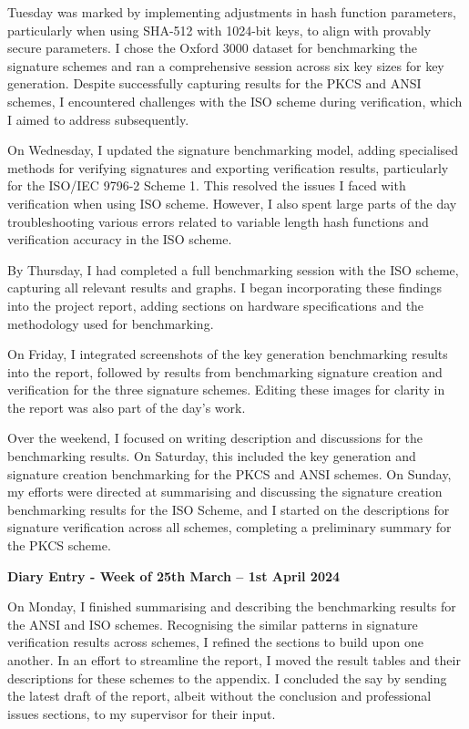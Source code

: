\documentclass[]{final_report}
\theoremstyle{definition}
\begin{document}
Tuesday was marked by implementing adjustments in hash function parameters, particularly when using SHA-512 with
1024-bit keys, to align with provably secure parameters. I chose the Oxford 3000 dataset for benchmarking the signature
schemes and ran a comprehensive session across six key sizes for key generation. Despite successfully capturing results
for the PKCS and ANSI schemes, I encountered challenges with the ISO scheme during verification, which I aimed to
address subsequently.

On Wednesday, I updated the signature benchmarking model, adding specialised methods for verifying signatures and
exporting verification results, particularly for the ISO/IEC 9796-2 Scheme 1. This resolved the issues I faced with verification when using ISO scheme. However, I also spent large parts of the day troubleshooting various errors related to variable length hash
functions and verification accuracy in the ISO scheme.

By Thursday, I had completed a full benchmarking session with the ISO scheme, capturing all relevant results and graphs.
I began incorporating these findings into the project report, adding sections on hardware specifications and the
methodology used for benchmarking.

On Friday, I integrated screenshots of the key generation benchmarking results into the report, followed by results from
benchmarking signature creation and verification for the three signature schemes. Editing these images for clarity in
the report was also part of the day’s work.

Over the weekend, I focused on writing description and discussions for the benchmarking results. On Saturday,
this included the key generation and signature creation benchmarking for the PKCS and ANSI schemes. On Sunday, my
efforts were directed at summarising and discussing the signature creation benchmarking results for the ISO Scheme, and
I started on the descriptions for signature verification across all schemes, completing a preliminary summary for the
PKCS scheme.

\textbf{Diary Entry - Week of 25th March – 1st April 2024}

On Monday, I finished summarising and describing the benchmarking results for the ANSI and ISO schemes. Recognising the
similar patterns in signature verification results across schemes, I refined the sections to build upon one another. In
an effort to streamline the report, I moved the result tables and their descriptions for these schemes
to the appendix. I concluded the say by sending the latest draft of the report, albeit without the conclusion and
professional issues sections, to my supervisor for their input.
\end{document}
